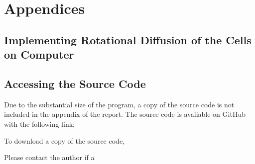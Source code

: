 \documentclass[a4paper,12pt]{article}
\begin{document}
\appendix
\section{Appendices}

%

\subsection{Implementing Rotational Diffusion of the Cells on Computer} 


\subsection{Accessing the Source Code}
Due to the substantial size of the program, a copy of the source code is not included in the appendix of the report. The source code is avaliable on GitHub with the following link: 

To download a copy of the source code, 

Please contact the author if a 
\end{document}
